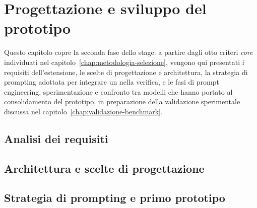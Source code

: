 \chapter{Progettazione e sviluppo del prototipo}
\label{chap:progettazione-prototipo}

Questo capitolo copre la seconda fase dello stage: a partire dagli otto criteri \emph{\emph{core}} individuati nel capitolo~\ref{chap:metodologia-selezione}, vengono qui presentati i requisiti dell'estensione, le scelte di progettazione e architettura, la strategia di prompting adottata per integrare un  nella verifica, e le fasi di prompt engineering, sperimentazione e confronto tra modelli che hanno portato al consolidamento del prototipo, in preparazione della validazione sperimentale discussa nel capitolo~\ref{chap:validazione-benchmark}.

\section{Analisi dei requisiti}
\label{sec:analisi-requisiti}




\section{Architettura e scelte di progettazione}
\label{sec:progettazione}




\section{Strategia di prompting e primo prototipo}
\label{sec:strategia-prompting}


